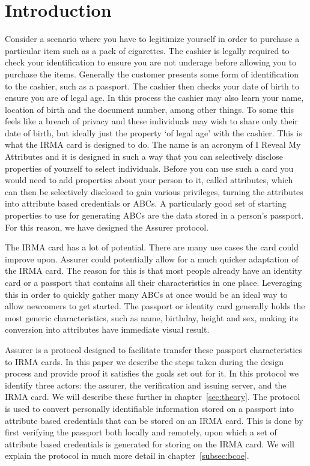 \chapter{Introduction}
Consider a scenario where you have to legitimize yourself in order to purchase a particular item such as a pack of cigarettes. The cashier is legally required to check your identification to ensure you are not underage before allowing you to purchase the items. Generally the customer presents some form of identification to the cashier, such as a passport. The cashier then checks your date of birth to ensure you are of legal age. In this process the cashier may also learn your name, location of birth and the document number, among other things. To some this feels like a breach of privacy and these individuals may wish to share only their date of birth, but ideally just the property `of legal age' with the cashier. This is what the IRMA card is designed to do. The name is an acronym of I Reveal My Attributes and it is designed in such a way that you can selectively disclose properties of yourself to select individuals. Before you can use such a card you would need to add properties about your person to it, called attributes, which can then be selectively disclosed to gain various privileges, turning the attributes into attribute based credentials or ABCs. A particularly good set of starting properties to use for generating ABCs are the data stored in a person's passport. For this reason, we have designed the Assurer protocol.

The IRMA card has a lot of potential. There are many use cases the card could improve upon. Assurer could potentially allow for a much quicker adaptation of the IRMA card. The reason for this is that most people already have an identity card or a passport that contains all their characteristics in one place. Leveraging this in order to quickly gather many ABCs at once would be an ideal way to allow newcomers to get started. The passport or identity card generally holds the most generic characteristics, such as name, birthday, height and sex, making its conversion into attributes have immediate visual result.

Assurer is a protocol designed to facilitate transfer these passport characteristics to IRMA cards. In this paper we describe the steps taken during the design process and provide proof it satisfies the goals set out for it. In this protocol we identify three actors: the assurer, the verification and issuing server, and the IRMA card. We will describe these further in chapter~\ref{sec:theory}. The protocol is used to convert personally identifiable information stored on a passport into attribute based credentials that can be stored on an IRMA card. This is done by first verifying the passport both locally and remotely, upon which a set of attribute based credentials is generated for storing on the IRMA card. We will explain the protocol in much more detail in chapter~\ref{subsec:bcoe}.

